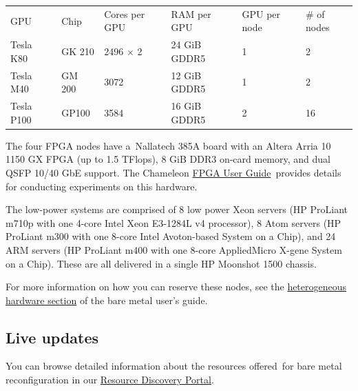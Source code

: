 \begin{longtable}[]{@{}llllll@{}}
\toprule
GPU & Chip & Cores per GPU & RAM per GPU & GPU per node & \# of
nodes\tabularnewline
Tesla K80 & GK 210 & 2496 $\times$ 2 & 24 GiB GDDR5 & 1 & 2\tabularnewline
Tesla M40 & GM 200 & 3072 & 12 GiB GDDR5 & 1 & 2\tabularnewline
Tesla P100 & GP100 & 3584 & 16 GiB GDDR5 & 2 & 16\tabularnewline
\bottomrule
\end{longtable}

The four FPGA nodes have a~Nallatech 385A board with an Altera Arria 10
1150 GX FPGA (up to 1.5 TFlops), 8 GiB DDR3 on-card memory, and dual
QSFP 10/40 GbE support. The Chameleon
\href{https://www.chameleoncloud.org/docs/bare-metal-user-guide/fpga/}{FPGA
User Guide}~provides details for conducting experiments on this
hardware.

The low-power systems are comprised of 8 low power Xeon servers (HP
ProLiant m710p with one 4-core Intel Xeon E3-1284L v4 processor), 8 Atom
servers (HP ProLiant m300 with one 8-core Intel Avoton-based System on a
Chip), and 24 ARM servers (HP ProLiant m400 with one 8-core AppliedMicro
X-gene System on a Chip). These are all delivered in a single HP
Moonshot 1500 chassis.

For more information on how you can reserve these nodes, see the
\href{https://www.chameleoncloud.org/docs/bare-metal-user-guide/\#heterogeneous_hardware}{heterogeneous
hardware section} of the bare metal user's guide.


\subsection{Live updates}
You can browse detailed information about the resources
offered~for bare metal reconfiguration in our
\href{https://www.chameleoncloud.org/user/discovery/}{Resource Discovery
Portal}.
